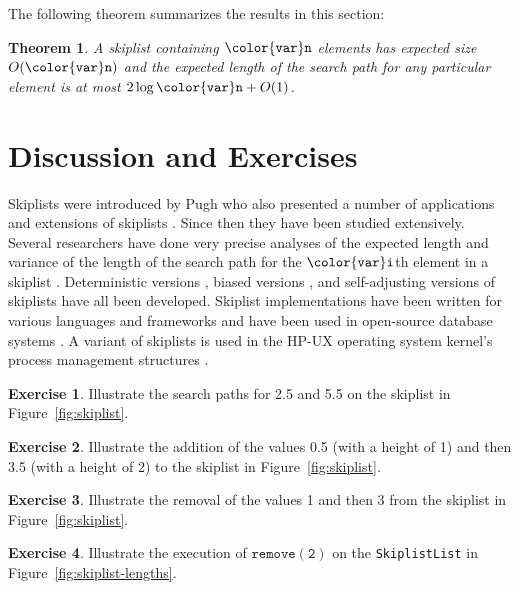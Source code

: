 \documentclass[10pt]{book}
\newcommand{\figref}[1]{Figure~\ref{fig:#1}}
\theoremstyle{plain}
\newtheorem{thm}{Theorem}[chapter]
\theoremstyle{definition}
\newtheorem{exc}{Exercise}[chapter]
\begin{document}
The following theorem summarizes the results in this section:
\begin{thm}
A skiplist containing $\ensuremath{\mathtt{{\color{var}n}}}$ elements has expected size $O(\ensuremath{\mathtt{{\color{var}n}}})$ and the
expected length of the search path for any particular element is at most
$2\log \ensuremath{\mathtt{{\color{var}n}}} + O(1)$.
\end{thm}





\section{Discussion and Exercises}

Skiplists were introduced by Pugh \cite{p91} who also presented
a number of applications and extensions of skiplists \cite{p89}.  Since then they
have been studied extensively.  Several researchers have done very
precise analyses of the expected length and variance of the length of the
search path for the \ensuremath{\mathtt{{\color{var}i}}}th element in a skiplist \cite{kp94,kmp95,pmp92}.
Deterministic versions \cite{mps92}, biased versions \cite{bbg02,esss01},
and self-adjusting versions \cite{bdl08} of skiplists have all been
developed.  Skiplist implementations have been written for various
languages and frameworks and have been used in open-source database
systems \cite{skipdb,redis}. A variant of skiplists is used in the HP-UX
operating system kernel's process management structures \cite{hpux}.


\begin{exc}
  Illustrate the search paths for 2.5 and 5.5 on the skiplist in 
  \figref{skiplist}.
\end{exc}

\begin{exc}
  Illustrate the addition of the values 0.5 (with a height of 1) and
  then 3.5 (with a height of 2) to the skiplist in \figref{skiplist}.
\end{exc}

\begin{exc}
  Illustrate the removal of the values 1 and then 3  from the skiplist
  in \figref{skiplist}.
\end{exc}

\begin{exc}
  Illustrate the execution of \ensuremath{\mathtt{remove(2)}} on the \texttt{SkiplistList}
  in \figref{skiplist-lengths}.
\end{exc}
\end{document}
